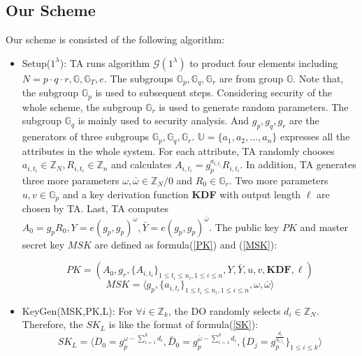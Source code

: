 \documentclass[smallextended]{svjour3}       %
\begin{document}
\subsection{Our Scheme}
Our scheme is consisted of the following algorithm:
\begin{itemize}
	\item Setup($1^\lambda$): 
		TA runs algorithm $\mathcal{G}(1^\lambda)$ to product four elements including $N=p\cdot q \cdot r,\mathbb{G},\mathbb{G}_T,e$. 
		The subgroups $\mathbb{G}_p,\mathbb{G}_q,\mathbb{G}_r$ are from group $\mathbb{G}$. 
		Note that, the subgroup $\mathbb{G}_p$ is used to subsequent steps. 
		Considering security of the whole scheme, the subgroup $\mathbb{G}_r$ is used to generate random parameters. 
		The subgroup $\mathbb{G}_q$ is mainly used to security analysis. 
		And $g_p,g_q,g_r$ are the generators of three subgroups $\mathbb{G}_p,\mathbb{G}_q,\mathbb{G}_r$. $\mathbb{U}=\{a_1,a_2,\dots,a_n\}$ expresses all the attributes in the whole system. 
		For each attribute, TA randomly chooses $a_{i,t_i} \in \mathbb{Z}_N, R_{i,t_i} \in \mathbb{Z}_n$ and calculates $A_{i,t_i}=g_{p}^{a_{i,t_i}}R_{i,t_i}$. 
		In addition, TA generates three more parameters $\omega, \bar{\omega} \in \mathbb{Z}_N/0$ and $R_0 \in \mathbb{G}_r$. 
		Two more parameters $u,v \in \mathbb{G}_p$ and a key derivation function \textbf{KDF} with output length $\ell$ are chosen by TA.
		Last, TA computes $A_0=g_pR_0,Y=e(g_p,g_p)^{\omega},\bar{Y}=e(g_p,g_p)^{\bar{\omega}}$. 
		The public key $PK$ and master secret key $MSK$ are defined as formula(\ref{PK}) and (\ref{MSK}):  
		
		\begin{equation}\label{PK}
			PK=\left( A_0,g_r,\{A_{i,t_i}\}_{1\leq t_i \leq n_i, 1 \leq i \leq n},Y,\bar{Y}, u, v, \textbf{KDF}, \ell \right)
		\end{equation}
		\begin{equation}\label{MSK}
			MSK=\langle g_p,\{a_{i,t_i}\}_{1\leq t_i \leq n_i, 1 \leq i \leq n},\omega,\bar{\omega}\rangle
		\end{equation}


	\item KeyGen(MSK,PK,L): For $\forall i \in \mathbb{Z}_k$, the DO randomly selects $d_i \in \mathbb{Z}_N$. Therefore, the $SK_L$ is like the format of formula(\ref{SK}):
	\begin{equation}\label{SK}
		SK_L=\langle D_0=g_p^{\omega - \sum_{i=1}^{k}d_i}, \bar{D}_0=g_p^{\bar{\omega} - \sum_{i=1}^{k}d_i}, \{D_j=g_p^{\frac{d_i}{a_{i,t_i}}}\}_{1 \leq i \leq k } \rangle
	\end{equation}



\end{itemize}
\end{document}
